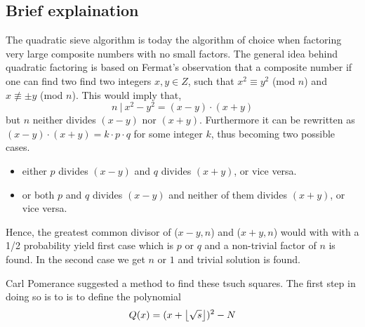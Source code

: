 \subsection{Brief explaination}
The quadratic sieve algorithm is today the algorithm of choice when factoring very large composite numbers
with no small factors. The general idea behind quadratic factoring is based on Fermat's observation that
a composite number if one can find two find two integers $x,y \in Z$, such
that $x^2 \equiv y^2$ (mod $n$) and $x \not\equiv \pm y$ (mod $n$). This would imply that,
\begin{equation}
n \ | \ x^2-y^2 = (x-y) \cdot (x+y)
\end{equation}
but $n$ neither divides $(x-y)$ nor $(x+y)$. 
Furthermore it can be rewritten as $(x-y) \cdot (x+y) = k \cdot p \cdot q$ for some integer $k$, thus becoming two possible cases.

\begin{itemize}
	\item either $p$ divides $(x-y)$ and $q$ divides $(x+y)$, or vice versa.
	\item or both $p$ and $q$ divides $(x-y)$ and neither of them divides $(x+y)$, or vice versa.
\end{itemize}

Hence, the greatest common divisor of ($x-y,n$) and ($x+y,n$) would with with a 1/2 probability yield first case which is $p$ or $q$ and a non-trivial factor of 
$n$ is found. In the second case we get $n$ or $1$ and trivial solution is found. 

Carl Pomerance suggested a method to find these tsuch squares\cite{Pomerance1985}. The first step in
doing so is to is to define the polynomial 
\begin{equation}
Q(x) = (x + \left \lfloor \sqrt{s} \right \rfloor)^2-N 
\end{equation}